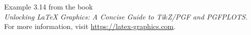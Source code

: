 \documentclass{article}
\begin{document}
Example 3.14 from the book\\
\emph{Unlocking LaTeX Graphics: A Concise Guide to Ti$k$Z/PGF and PGFPLOTS}.\\
For more information, visit \url{https://latex-graphics.com}.
\par\bigskip

\end{document}
